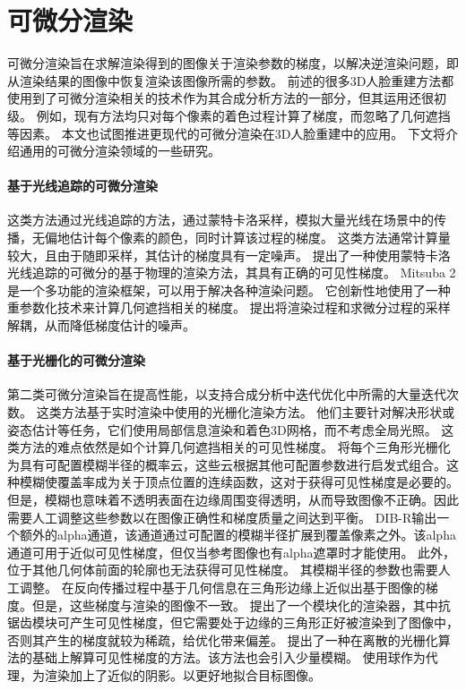 \section{可微分渲染}

可微分渲染旨在求解渲染得到的图像关于渲染参数的梯度，以解决逆渲染问题，即从渲染结果的图像中恢复渲染该图像所需的参数。
前述的很多3D人脸重建方法都使用到了可微分渲染相关的技术作为其合成分析方法的一部分，但其运用还很初级。
例如，现有方法均只对每个像素的着色过程计算了梯度，而忽略了几何遮挡等因素。
本文也试图推进更现代的可微分渲染在3D人脸重建中的应用。
下文将介绍通用的可微分渲染领域的一些研究。

\paragraph{基于光线追踪的可微分渲染}
这类方法通过光线追踪的方法，通过蒙特卡洛采样，模拟大量光线在场景中的传播，无偏地估计每个像素的颜色，同时计算该过程的梯度。
这类方法通常计算量较大，且由于随即采样，其估计的梯度具有一定噪声。
\citet{redner}提出了一种使用蒙特卡洛光线追踪的可微分的基于物理的渲染方法，其具有正确的可见性梯度。
Mitsuba 2\citep{Mitsuba2}是一个多功能的渲染框架，可以用于解决各种渲染问题。
它创新性地使用了一种重参数化技术来计算几何遮挡相关的梯度。
\citet{ZeltnerSGJ21}提出将渲染过程和求微分过程的采样解耦，从而降低梯度估计的噪声。

\paragraph{基于光栅化的可微分渲染}
第二类可微分渲染旨在提高性能，以支持合成分析中迭代优化中所需的大量迭代次数。
这类方法基于实时渲染中使用的光栅化渲染方法。
他们主要针对解决形状或姿态估计等任务，它们使用局部信息渲染和着色3D网格，而不考虑全局光照。
这类方法的难点依然是如个计算几何遮挡相关的可见性梯度。
\citet{softras}将每个三角形光栅化为具有可配置模糊半径的概率云，这些云根据其他可配置参数进行启发式组合。这种模糊使覆盖率成为关于顶点位置的连续函数，这对于获得可见性梯度是必要的。
但是，模糊也意味着不透明表面在边缘周围变得透明，从而导致图像不正确。因此需要人工调整这些参数以在图像正确性和梯度质量之间达到平衡。
DIB-R\citep{ChenLGSLJF19}输出一个额外的alpha通道，该通道通过可配置的模糊半径扩展到覆盖像素之外。该alpha通道可用于近似可见性梯度，但仅当参考图像也有alpha遮罩时才能使用。
此外，位于其他几何体前面的轮廓也无法获得可见性梯度。
其模糊半径的参数也需要人工调整。
\citet{KatoUH18}在反向传播过程中基于几何信息在三角形边缘上近似出基于图像的梯度。但是，这些梯度与渲染的图像不一致。
\citet{nvdiffrast}提出了一个模块化的渲染器，其中抗锯齿模块可产生可见性梯度，但它需要处于边缘的三角形正好被渲染到了图像中，否则其产生的梯度就较为稀疏，给优化带来偏差。
\citet{ColeGSVZ21}提出了一种在离散的光栅化算法的基础上解算可见性梯度的方法。该方法也会引入少量模糊。
\citet{LyuHL0TT21}使用球作为代理，为渲染加上了近似的阴影。以更好地拟合目标图像。

